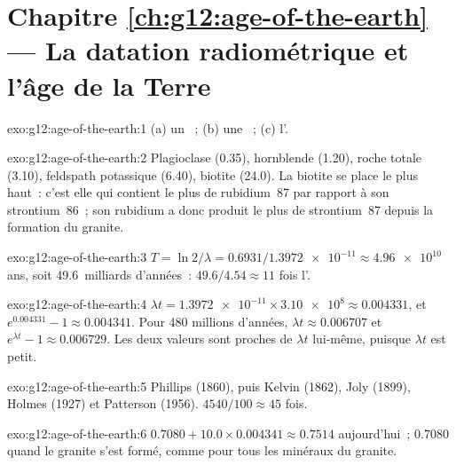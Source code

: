 \section*{Chapitre \ref{ch:g12:age-of-the-earth} --- La datation radiométrique et l'âge de la Terre}

\begin{solution}{exo:g12:age-of-the-earth:1}
(a) un ~; (b) une ~; (c) l'.
\end{solution}

\begin{solution}{exo:g12:age-of-the-earth:2}
Plagioclase (0.35), hornblende (1.20), roche totale (3.10), feldspath
potassique (6.40), biotite (24.0). La biotite se place le plus haut~: c'est
elle qui contient le plus de rubidium~87 par rapport à son strontium~86~;
son rubidium a donc produit le plus de strontium~87 depuis la formation du
granite.
\end{solution}

\begin{solution}{exo:g12:age-of-the-earth:3}
$T = \ln 2/\lambda = 0.6931/\num{1.3972e-11} \approx \num{4.96e10}$ ans,
soit 49.6~milliards d'années~: $49.6/4.54 \approx 11$ fois l'.
\end{solution}

\begin{solution}{exo:g12:age-of-the-earth:4}
$\lambda t = \num{1.3972e-11} \times \num{3.10e8} \approx 0.004331$, et
$e^{0.004331} - 1 \approx 0.004341$. Pour 480 millions d'années, $\lambda t
\approx 0.006707$ et $e^{\lambda t} - 1 \approx 0.006729$. Les deux valeurs
sont proches de $\lambda t$ lui-même, puisque $\lambda t$ est petit.
\end{solution}

\begin{solution}{exo:g12:age-of-the-earth:5}
Phillips (1860), puis Kelvin (1862), Joly (1899), Holmes (1927) et
Patterson (1956). $4540/100 \approx 45$ fois.
\end{solution}

\begin{solution}{exo:g12:age-of-the-earth:6}
$0.7080 + 10.0 \times 0.004341 \approx 0.7514$ aujourd'hui~; 0.7080 quand le
granite s'est formé, comme pour tous les minéraux du granite.
\end{solution}

